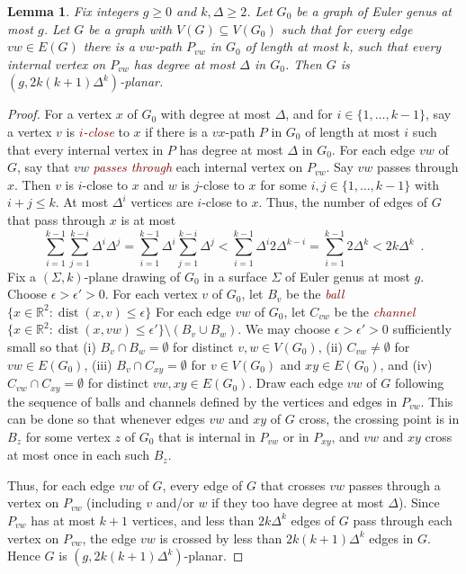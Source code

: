 \documentclass{patmorin}
\theoremstyle{plain}
\newtheorem{lem}[thm]{Lemma}
\theoremstyle{definition}
\newcommand{\defin}[1]{\textcolor{Maroon}{\emph{#1}}}
\DeclareMathOperator{\dist}{dist}
\renewcommand{\geq}{\geqslant}
\renewcommand{\leq}{\leqslant}
\begin{document}
\begin{lem}
	\label{DrawG}
	Fix integers $g\geq 0$ and $k,\Delta\geq 2$.
	Let $G_0$ be a graph of Euler genus at most $g$. Let $G$ be
	a graph with $V(G) \subseteq V(G_0)$ such that for every edge $vw \in
	E(G)$ there is a $vw$-path $P_{vw}$ in $G_0$ of length at most $k$, such
	that every internal vertex on $P_{vw}$ has degree at most $\Delta$ in
	$G_0$. Then $G$ is $(g, 2k(k+1)\Delta^{k} )$-planar.
\end{lem}

\begin{proof}
	For a vertex $x$ of $G_0$ with degree at most $\Delta$, and for $i\in\{1,\dots,k-1\}$, say a vertex $v$ is \defin{$i$-close} to $x$ if there is a $vx$-path $P$ in $G_0$ of length at most $i$ such that every internal vertex in $P$  has degree at most $\Delta$ in $G_0$.
	For each edge $vw$ of $G$, say that $vw$ \defin{passes through} each internal vertex on $P_{vw}$.	Say $vw$ passes through $x$. Then $v$ is $i$-close to $x$ and $w$ is $j$-close to $x$ for some $i,j\in\{1,\dots,k-1\}$ with $i+j\leq k$. At most $\Delta^{i}$ vertices are $i$-close to $x$.
	Thus, the number of edges of $G$ that pass through $x$ is at most
	\[
	\sum_{i=1}^{k-1} \sum_{j=1}^{k-i} \Delta^i \Delta^j
	= \sum_{i=1}^{k-1} \Delta^i  \sum_{j=1}^{k-i} \Delta^j
	< \sum_{i=1}^{k-1} \Delta^i  2 \Delta^{k-i}
	= \sum_{i=1}^{k-1} 2\Delta^k
	< 2k \Delta^k \enspace.
	\]
	Fix a $(\Sigma,k)$-plane drawing of $G_0$ in a surface $\Sigma$ of Euler genus at most $g$. Choose $\epsilon>\epsilon'>0$.
	For each vertex $v$ of $G_0$, let $B_v$ be the \defin{ball} $\{x\in \mathbb{R}^2:\dist(x,v)\leq\epsilon\}$
	For each edge $vw$ of $G_0$, let $C_{vw}$ be the \defin{channel} $\{x\in \mathbb{R}^2:\dist(x,vw)\leq\epsilon'\}\setminus(B_v\cup B_w)$.
	We may choose $\epsilon>\epsilon'>0$ sufficiently small so that
	(i) $B_v\cap B_w=\emptyset$ for distinct $v,w\in V(G_0)$,
	(ii) $C_{vw}\neq\emptyset$ for $vw\in E(G_0)$,
	(iii) $B_v\cap C_{xy}=\emptyset$ for $v\in V(G_0)$ and $xy\in E(G_0)$, and
	(iv) $C_{vw}\cap C_{xy}=\emptyset$ for distinct $vw,xy\in E(G_0)$.
	Draw each edge $vw$ of $G$ following the sequence of balls and channels defined by the vertices and edges in $P_{vw}$.
	This can be done so that whenever edges $vw$ and $xy$ of $G$ cross, the crossing point is in $B_z$ for some vertex $z$ of $G_0$ that is internal in $P_{vw}$ or in $P_{xy}$, and $vw$ and $xy$ cross at most once in each such $B_z$.

  Thus, for each edge $vw$ of $G$, every edge of $G$ that crosses $vw$ passes through a vertex on $P_{vw}$ (including $v$ and/or $w$ if they too have degree at most $\Delta$).
	Since $P_{vw}$ has at most $k+1$ vertices, and less than $2k\Delta^{k}$ edges of $G$ pass through each vertex on $P_{vw}$, the edge $vw$ is crossed by less than $2k(k+1)\Delta^{k}$ edges in $G$. Hence $G$ is $(g, 2k(k+1)\Delta^{k} )$-planar.
\end{proof}
\end{document}
